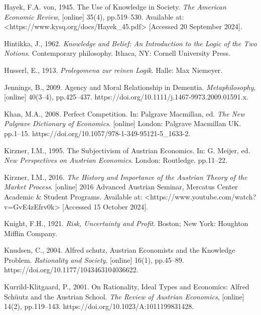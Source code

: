 Hayek, F.A. von, 1945. The Use of Knowledge in Society. \textit{The American Economic Review}, [online] 35(4), pp.519–530. Available at: {\textless}https://www.kysq.org/docs/Hayek\_45.pdf{\textgreater} [Accessed 20 September 2024].



Hintikka, J., 1962. \textit{Knowledge and Belief: An Introduction to the Logic of the Two Notions}. Contemporary philosophy. Ithaca, NY: Cornell University Press.



Husserl, E., 1913. \textit{Prolegomena zur reinen Logik}. Halle: Max Niemeyer.



Jennings, B., 2009. Agency and Moral Relationship in Dementia. \textit{Metaphilosophy}, [online] 40(3–4), pp.425–437. https://doi.org/10.1111/j.1467-9973.2009.01591.x.



Khan, M.A., 2008. Perfect Competition. In: Palgrave Macmillan, ed. \textit{The New Palgrave Dictionary of Economics}. [online] London: Palgrave Macmillan UK. pp.1–15. https://doi.org/10.1057/978-1-349-95121-5\_1633-2.



Kirzner, I.M., 1995. The Subjectivism of Austrian Economics. In: G. Meijer, ed. \textit{New Perspectives on Austrian Economics}. London: Routledge. pp.11–22.



Kirzner, I.M., 2016. \textit{The History and Importance of the Austrian Theory of the Market Process}. [online] 2016 Advanced Austrian Seminar, Mercatus Center Academic \& Student Programs. Available at: {\textless}https://www.youtube.com/watch?v=GvE4zEfrv0k{\textgreater} [Accessed 15 October 2024].



Knight, F.H., 1921. \textit{Risk, Uncertainty and Profit}. Boston; New York: Houghton Mifflin Company.



Knudsen, C., 2004. Alfred schutz, Austrian Economists and the Knowledge Problem. \textit{Rationality and Society}, [online] 16(1), pp.45–89. https://doi.org/10.1177/1043463104036622.



Kurrild-Klitgaard, P., 2001. On Rationality, Ideal Types and Economics: Alfred Schüutz and the Austrian School. \textit{The Review of Austrian Economics}, [online] 14(2), pp.119–143. https://doi.org/10.1023/A:1011199831428.



